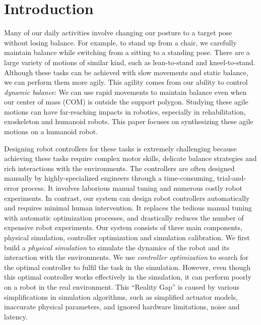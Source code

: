 \section{Introduction}


Many of our daily activities involve changing our posture to a target pose without losing balance. For example, to stand up from a chair, we carefully maintain balance while switching from a sitting to a standing pose. There are a large variety of motions of similar kind, such as lean-to-stand and kneel-to-stand. Although these tasks can be achieved with slow movements and static balance, we can perform them more agily. This agility comes from our ability to control \emph{dynamic balance}: We can use rapid movements to maintain balance even when our center of mass (COM) is outside the support polygon. Studying these agile motions can have far-reaching impacts in robotics, especially in rehabilitation, exoskeleton and humanoid robots. This paper focuses on synthesizing these agile motions on a humanoid robot.



Designing robot controllers for these tasks is extremely challenging because achieving these tasks require complex motor skills, delicate balance strategies and rich interactions with the environments. The controllers are often designed manually by highly-specialized engineers through a time-consuming, trial-and-error process. It involves laborious manual tuning and numerous costly robot experiments. In contrast, our system can design robot controllers automatically and requires minimal human intervention. It replaces the tedious manual tuning with automatic optimization processes, and drastically reduces the number of expensive robot experiments. Our system consists of three main components, physical simulation, controller optimization and simulation calibration. We first build a \emph{physical simulation} to simulate the dynamics of the robot and its interaction with the environments. We use \emph{controller optimization} to search for the optimal controller to fulfil the task in the simulation. However, even though this optimal controller works effectively in the simulation, it can perform poorly on a robot in the real environment. This ``Reality Gap'' \cite{Jakobi95} is caused by various simplifications in simulation algorithms, such as simplified actuator models, inaccurate physical parameters, and ignored hardware limitations, noise and latency. 

